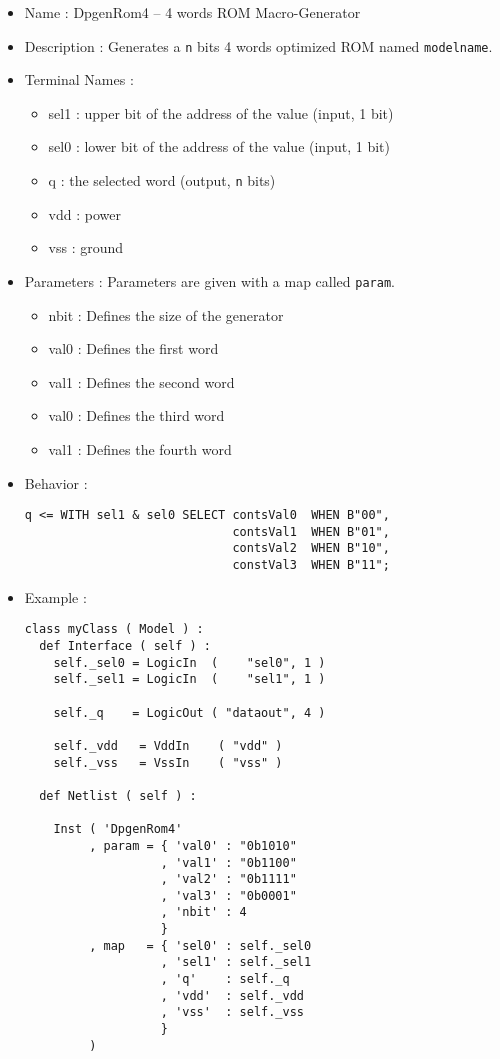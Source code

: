 \begin{itemize}
    \item Name : DpgenRom4 -- 4 words ROM Macro-Generator
    \item Description : Generates a \verb-n- bits 4 words optimized ROM named \verb-modelname-.
    \item Terminal Names :
    \begin{itemize}
        \item sel1 : upper bit of the address of the value (input, 1 bit)
        \item sel0 : lower bit of the address of the value (input, 1 bit)
        \item q : the selected word (output, \verb-n- bits)
        \item vdd : power
        \item vss : ground
    \end{itemize}
    \item Parameters : Parameters are given with a map called \verb-param-.
    \begin{itemize}
        \item nbit : Defines the size of the generator
        \item val0 : Defines the first word
        \item val1 : Defines the second word
        \item val0 : Defines the third word
        \item val1 : Defines the fourth word
    \end{itemize}
    \item Behavior :
\begin{verbatim}
q <= WITH sel1 & sel0 SELECT contsVal0  WHEN B"00",
                             contsVal1  WHEN B"01",
                             contsVal2  WHEN B"10",
                             constVal3  WHEN B"11";
\end{verbatim}
    \item Example :
\begin{verbatim}
class myClass ( Model ) :
  def Interface ( self ) :
    self._sel0 = LogicIn  (    "sel0", 1 )
    self._sel1 = LogicIn  (    "sel1", 1 )
    
    self._q    = LogicOut ( "dataout", 4 )
    
    self._vdd   = VddIn    ( "vdd" )
    self._vss   = VssIn    ( "vss" )
    
  def Netlist ( self ) :

    Inst ( 'DpgenRom4'
         , param = { 'val0' : "0b1010"
                   , 'val1' : "0b1100"
                   , 'val2' : "0b1111"
                   , 'val3' : "0b0001"
                   , 'nbit' : 4
                   }
         , map   = { 'sel0' : self._sel0
                   , 'sel1' : self._sel1
                   , 'q'    : self._q
                   , 'vdd'  : self._vdd
                   , 'vss'  : self._vss
                   }
         ) 
\end{verbatim}
\end{itemize}
